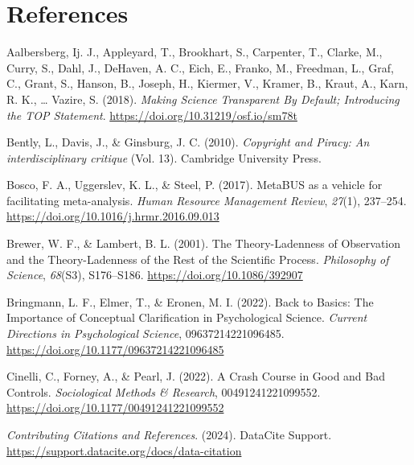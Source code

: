 \documentclass[
  man, noextraspace,floatsintext]{apa7}
\newlength{\cslhangindent}
\newenvironment{CSLReferences}[2] %
 {\begin{list}{}{%
  \setlength{\itemindent}{0pt}
  \setlength{\leftmargin}{0pt}
  \setlength{\parsep}{0pt}
  \ifodd #1
   \setlength{\leftmargin}{\cslhangindent}
   \setlength{\itemindent}{-1\cslhangindent}
  \fi
  \setlength{\itemsep}{#2\baselineskip}}}
 {\end{list}}
\begin{document}
\newpage

\section{References}\label{references}

\label{refs}
\begin{CSLReferences}{1}{0}
Aalbersberg, Ij. J., Appleyard, T., Brookhart, S., Carpenter, T., Clarke, M., Curry, S., Dahl, J., DeHaven, A. C., Eich, E., Franko, M., Freedman, L., Graf, C., Grant, S., Hanson, B., Joseph, H., Kiermer, V., Kramer, B., Kraut, A., Karn, R. K., \ldots{} Vazire, S. (2018). \emph{Making {Science Transparent By Default}; {Introducing} the {TOP Statement}}. \url{https://doi.org/10.31219/osf.io/sm78t}

Bently, L., Davis, J., \& Ginsburg, J. C. (2010). \emph{Copyright and {Piracy}: {An} interdisciplinary critique} (Vol. 13). Cambridge University Press.

Bosco, F. A., Uggerslev, K. L., \& Steel, P. (2017). {MetaBUS} as a vehicle for facilitating meta-analysis. \emph{Human Resource Management Review}, \emph{27}(1), 237--254. \url{https://doi.org/10.1016/j.hrmr.2016.09.013}

Brewer, W. F., \& Lambert, B. L. (2001). The {Theory-Ladenness} of {Observation} and the {Theory-Ladenness} of the {Rest} of the {Scientific Process}. \emph{Philosophy of Science}, \emph{68}(S3), S176--S186. \url{https://doi.org/10.1086/392907}

Bringmann, L. F., Elmer, T., \& Eronen, M. I. (2022). Back to {Basics}: {The Importance} of {Conceptual Clarification} in {Psychological Science}. \emph{Current Directions in Psychological Science}, 09637214221096485. \url{https://doi.org/10.1177/09637214221096485}

Cinelli, C., Forney, A., \& Pearl, J. (2022). A {Crash Course} in {Good} and {Bad Controls}. \emph{Sociological Methods \& Research}, 00491241221099552. \url{https://doi.org/10.1177/00491241221099552}

\emph{Contributing {Citations} and {References}}. (2024). DataCite Support. \url{https://support.datacite.org/docs/data-citation}


\end{CSLReferences}
\end{document}
